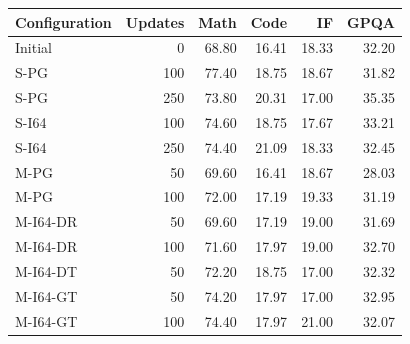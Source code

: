 \begin{tabular}{lrrrrr}
\toprule
Configuration & Updates & Math & Code & IF & GPQA \\
\midrule
Initial & 0 & 68.80 & 16.41 & 18.33 & 32.20 \\
S-PG & 100 & 77.40 & 18.75 & 18.67 & 31.82 \\
S-PG & 250 & 73.80 & 20.31 & 17.00 & 35.35 \\
S-I64 & 100 & 74.60 & 18.75 & 17.67 & 33.21 \\
S-I64 & 250 & 74.40 & 21.09 & 18.33 & 32.45 \\
M-PG & 50 & 69.60 & 16.41 & 18.67 & 28.03 \\
M-PG & 100 & 72.00 & 17.19 & 19.33 & 31.19 \\
M-I64-DR & 50 & 69.60 & 17.19 & 19.00 & 31.69 \\
M-I64-DR & 100 & 71.60 & 17.97 & 19.00 & 32.70 \\
M-I64-DT & 50 & 72.20 & 18.75 & 17.00 & 32.32 \\
M-I64-GT & 50 & 74.20 & 17.97 & 17.00 & 32.95 \\
M-I64-GT & 100 & 74.40 & 17.97 & 21.00 & 32.07 \\
\bottomrule
\end{tabular}
